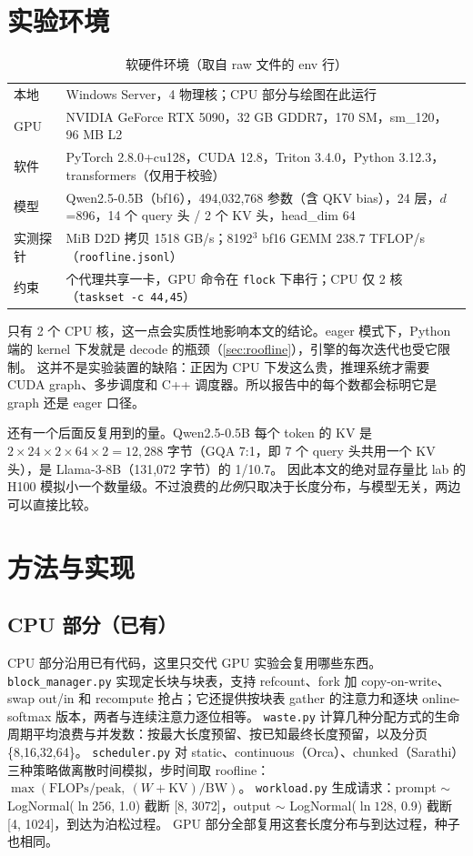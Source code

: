 \documentclass[11pt,a4paper]{ctexart}
\begin{document}
\section{实验环境}
\begin{table}[H]\centering\small
\caption{软硬件环境（取自 raw 文件的 env 行）}
\begin{tabularx}{\linewidth}{l>{\raggedright\arraybackslash}X}
\toprule
本地 & Windows Server，4 物理核；CPU 部分与绘图在此运行 \\
GPU & NVIDIA GeForce RTX 5090，32 GB GDDR7，170 SM，sm\_120，96 MB L2 \\
软件 & PyTorch 2.8.0+cu128，CUDA 12.8，Triton 3.4.0，Python 3.12.3，transformers（仅用于校验） \\
模型 & Qwen2.5-0.5B（bf16），494,032,768 参数（含 QKV bias），24 层，$d$=896，14 个 query 头 / 2 个 KV 头，head\_dim 64 \\
实测探针 & 512 MiB D2D 拷贝 1518 GB/s；8192$^3$ bf16 GEMM 238.7 TFLOP/s（\texttt{roofline.jsonl}） \\
约束 & 7 个代理共享一卡，GPU 命令在 \texttt{flock} 下串行；CPU 仅 2 核（\texttt{taskset -c 44,45}） \\
\bottomrule
\end{tabularx}
\end{table}
只有 2 个 CPU 核，这一点会实质性地影响本文的结论。eager 模式下，Python 端的 kernel 下发就是 decode 的瓶颈（\cref{sec:roofline}），引擎的每次迭代也受它限制。
这并不是实验装置的缺陷：正因为 CPU 下发这么贵，推理系统才需要 CUDA graph、多步调度和 C++ 调度器。所以报告中的每个数都会标明它是 graph 还是 eager 口径。

还有一个后面反复用到的量。Qwen2.5-0.5B 每个 token 的 KV 是 $2\times24\times2\times64\times2=12{,}288$ 字节（GQA 7:1，即 7 个 query 头共用一个 KV 头），是 Llama-3-8B（131,072 字节）的 1/10.7。
因此本文的绝对显存量比 lab 的 H100 模拟小一个数量级。不过浪费的\emph{比例}只取决于长度分布，与模型无关，两边可以直接比较。

\section{方法与实现}
\subsection{CPU 部分（已有）}
CPU 部分沿用已有代码，这里只交代 GPU 实验会复用哪些东西。
\texttt{block\_manager.py} 实现定长块与块表，支持 refcount、fork 加 copy-on-write、swap out/in 和 recompute 抢占；它还提供按块表 gather 的注意力和逐块 online-softmax 版本，两者与连续注意力逐位相等。
\texttt{waste.py} 计算几种分配方式的生命周期平均浪费与并发数：按最大长度预留、按已知最终长度预留，以及分页 \{8,16,32,64\}。
\texttt{scheduler.py} 对 static、continuous（Orca）、chunked（Sarathi）三种策略做离散时间模拟，步时间取 roofline：$\max(\text{FLOPs}/\text{peak},\ (W + \text{KV})/\text{BW})$。
\texttt{workload.py} 生成请求：prompt $\sim$ LogNormal($\ln256$, 1.0) 截断 [8, 3072]，output $\sim$ LogNormal($\ln128$, 0.9) 截断 [4, 1024]，到达为泊松过程。
GPU 部分全部复用这套长度分布与到达过程，种子也相同。
\end{document}
